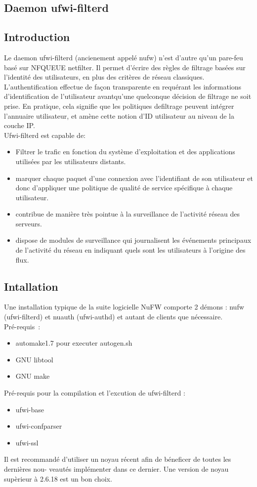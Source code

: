 \documentclass[12pt]{report}
\begin{document}
\begin{itemize}
\chapter{Daemon ufwi-filterd}
\section{Introduction}

	Le daemon ufwi-filterd (ancienement appelé nufw) n'est d'autre qu'un pare-feu basé sur NFQUEUE netfilter. Il permet d'écrire des règles de filtrage basées sur l'identité des utilisateurs, en plus des critères de réseau classiques. L'authentification effectue de façon transparente en requérant les informations d’identification de l’utilisateur avantqu’une quelconque décision de filtrage ne soit prise. En pratique, cela signifie que les politiques defiltrage peuvent intégrer l’annuaire utilisateur, et amène cette notion d’ID utilisateur au niveau de la couche IP.\\
Ufwi-filterd est capable de:
\begin{itemize}
  \item Filtrer le trafic en fonction du système d’exploitation et des applications utilisées par les utilisateurs
     distants.
  \item marquer chaque paquet d'une connexion avec l'identifiant de son utilisateur et donc d'appliquer une politique de qualité de service spécifique à chaque utilisateur. 
  \item contribue de manière très pointue à la surveillance de l'activité réseau des serveurs.
  \item dispose de modules de surveillance qui journalisent les événements principaux de l'activité du réseau en indiquant quels sont les utilisateurs à l'origine des flux.
\end{itemize}
\section{Intallation}
Une installation typique de la suite logicielle NuFW comporte 2 démons : nufw (ufwi-filterd) et nuauth (ufwi-authd) et autant de clients que nécessaire.\\
Pré-requis :
\begin{itemize}
  \item automake1.7 pour executer autogen.sh
  \item GNU libtool
  \item GNU make
\end{itemize}
Pré-requis pour la compilation et l'excution de ufwi-filterd :
\begin{itemize}
  \item ufwi-base
  \item ufwi-confparser
  \item ufwi-ssl
\end{itemize}
Il est recommandé d'utiliser un noyau récent afin de béneficer de toutes les dernières nou-
veautés implémenter dans ce dernier. Une version de noyau supèrieur à 2.6.18 est un bon choix.
\newpage

\end{itemize}
\end{document}
